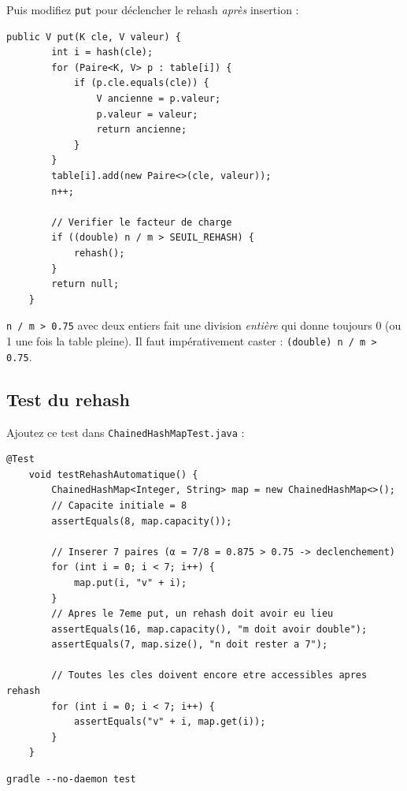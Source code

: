 \documentclass[11pt,a4paper]{article}
\begin{document}
Puis modifiez \texttt{put} pour déclencher le rehash \emph{après} insertion :

\begin{lstlisting}[style=java]
    public V put(K cle, V valeur) {
        int i = hash(cle);
        for (Paire<K, V> p : table[i]) {
            if (p.cle.equals(cle)) {
                V ancienne = p.valeur;
                p.valeur = valeur;
                return ancienne;
            }
        }
        table[i].add(new Paire<>(cle, valeur));
        n++;

        // Verifier le facteur de charge
        if ((double) n / m > SEUIL_REHASH) {
            rehash();
        }
        return null;
    }
\end{lstlisting}

\begin{attentionbox}
\texttt{n / m > 0.75} avec deux entiers fait une division \emph{entière} qui donne toujours 0 (ou 1 une fois la table pleine). Il faut impérativement caster : \texttt{(double) n / m > 0.75}.
\end{attentionbox}

\subsection{Test du rehash}

Ajoutez ce test dans \texttt{ChainedHashMapTest.java} :

\begin{lstlisting}[style=java]
    @Test
    void testRehashAutomatique() {
        ChainedHashMap<Integer, String> map = new ChainedHashMap<>();
        // Capacite initiale = 8
        assertEquals(8, map.capacity());

        // Inserer 7 paires (α = 7/8 = 0.875 > 0.75 -> declenchement)
        for (int i = 0; i < 7; i++) {
            map.put(i, "v" + i);
        }
        // Apres le 7eme put, un rehash doit avoir eu lieu
        assertEquals(16, map.capacity(), "m doit avoir double");
        assertEquals(7, map.size(), "n doit rester a 7");

        // Toutes les cles doivent encore etre accessibles apres rehash
        for (int i = 0; i < 7; i++) {
            assertEquals("v" + i, map.get(i));
        }
    }
\end{lstlisting}

\begin{lstlisting}[style=bash]
gradle --no-daemon test
\end{lstlisting}
\end{document}
